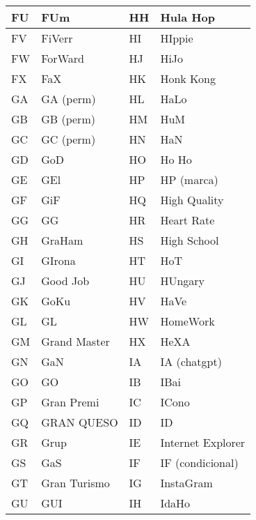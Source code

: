 \begin{table}[h]
    \centering
    \begin{tabular}{l|l|l|l}
    FU & FUm            & HH & Hula Hop             \\\hline
    FV & FiVerr         & HI & HIppie               \\\hline
    FW & ForWard        & HJ & HiJo                 \\\hline
    FX & FaX            & HK & Honk Kong            \\\hline
    GA & GA (perm)      & HL & HaLo                 \\\hline
    GB & GB (perm)      & HM & HuM                  \\\hline
    GC & GC (perm)      & HN & HaN                  \\\hline
    GD & GoD            & HO & Ho Ho                \\\hline
    GE & GEl            & HP & HP (marca)           \\\hline
    GF & GiF            & HQ & High Quality         \\\hline
    GG & GG             & HR & Heart Rate           \\\hline
    GH & GraHam         & HS & High School          \\\hline
    GI & GIrona         & HT & HoT                  \\\hline
    GJ & Good Job       & HU & HUngary              \\\hline
    GK & GoKu           & HV & HaVe                 \\\hline
    GL & GL             & HW & HomeWork             \\\hline
    GM & Grand Master   & HX & HeXA                 \\\hline
    GN & GaN            & IA & IA (chatgpt)         \\\hline
    GO & GO             & IB & IBai                 \\\hline
    GP & Gran Premi     & IC & ICono                \\\hline
    GQ & GRAN QUESO     & ID & ID                   \\\hline
    GR & Grup           & IE & Internet Explorer    \\\hline
    GS & GaS            & IF & IF (condicional)     \\\hline
    GT & Gran Turismo   & IG & InstaGram            \\\hline
    GU & GUI            & IH & IdaHo                \\\hline

\end{tabular}
\end{table}
